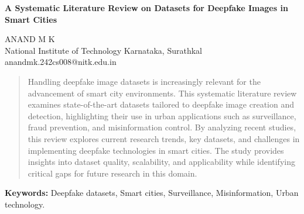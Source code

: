\documentclass[a4paper]{article}
\begin{document}
\begin{center}
    \Large \textbf{A Systematic Literature Review on Datasets for Deepfake Images in Smart Cities}
\end{center}

\begin{center}
    \normalsize
    ANAND M K \\
    National Institute of Technology Karnataka, Surathkal \\
    anandmk.242cs008@nitk.edu.in
\end{center}

\begin{abstract}
Handling deepfake image datasets is increasingly relevant for the advancement of smart city environments. This systematic literature review examines state-of-the-art datasets tailored to deepfake image creation and detection, highlighting their use in urban applications such as surveillance, fraud prevention, and misinformation control. By analyzing recent studies, this review explores current research trends, key datasets, and challenges in implementing deepfake technologies in smart cities. The study provides insights into dataset quality, scalability, and applicability while identifying critical gaps for future research in this domain.
\end{abstract}

\noindent \textbf{Keywords:} Deepfake datasets, Smart cities, Surveillance, Misinformation, Urban technology.
\end{document}
